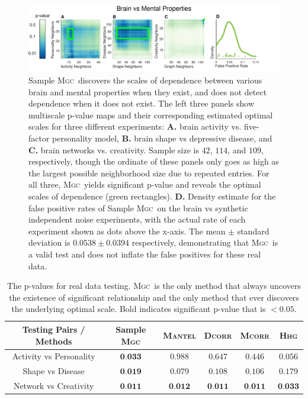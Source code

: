 \documentclass[11pt]{article}
\providecommand{\sct}[1]{{\normalfont\textsc{#1}}}
\newcommand{\Mgc}{\sct{Mgc}}
\newcommand{\Hhg}{\sct{Hhg}}
\newcommand{\Dcorr}{\sct{Dcorr}}
\newcommand{\Mcorr}{\sct{Mcorr}}
\newcommand{\Mantel}{\sct{Mantel}}
\begin{document}
\begin{figure}[htbp]
\includegraphics[width=1.0\textwidth,trim={0 0 1.5cm 0},clip]{Figures/FigReal}
\caption{Sample \Mgc~discovers the scales of dependence between various brain and mental properties when they exist, and does not detect dependence when it does not exist.  The left three panels show multiscale p-value maps and their corresponding estimated optimal scales for three different experiments: \textbf{A.}  brain activity vs. five-factor personality model, \textbf{B.}  brain shape vs depressive disease, and \textbf{C.} brain networks vs. creativity. Sample size is $42$, $114$, and $109$, respectively, though the ordinate of these panels only goes as high as the largest possible neighborhood size due to repeated entries.  
For all three, \Mgc~yields significant p-value and reveals the optimal scales of dependence (green rectangles).
\textbf{D.} Density estimate for the false positive rates of Sample \Mgc~on the brain vs synthetic independent noise experiments, with the actual rate of each experiment shown as dots above the x-axis. The mean $\pm$ standard deviation is $0.0538 \pm 0.0394$ respectively, demonstrating that \Mgc~is a valid test and does not inflate the false positives for these real data.}
\label{f:real}
\end{figure}

\begin{table}[htbp]
\centering
\begin{tabular}{|c||c|c|c|c|c|}
\hline
Testing Pairs / Methods & Sample \Mgc & \Mantel & \Dcorr & \Mcorr & \Hhg \\
\hline
Activity vs Personality & $\textbf{0.033}$  & $0.988$ & $0.647$ & $0.446$ & $0.056$ \\
\hline
Shape vs Disease & $\textbf{0.019}$  & $0.079$ & $0.108$ & $0.106$ & $0.179$ \\
\hline
Network vs Creativity & $\textbf{0.011}$  & $\textbf{0.012}$ & $\textbf{0.011}$ & $\textbf{0.011}$ & $\textbf{0.033}$ \\
\hline
\end{tabular}
\caption{The p-values for real data testing. \Mgc~is the only method that always uncovers the existence of significant relationship and the only method that ever discovers the underlying optimal scale. Bold indicates significant p-value that is $<0.05$.}
\label{t:real}%
\end{table}
\end{document}
